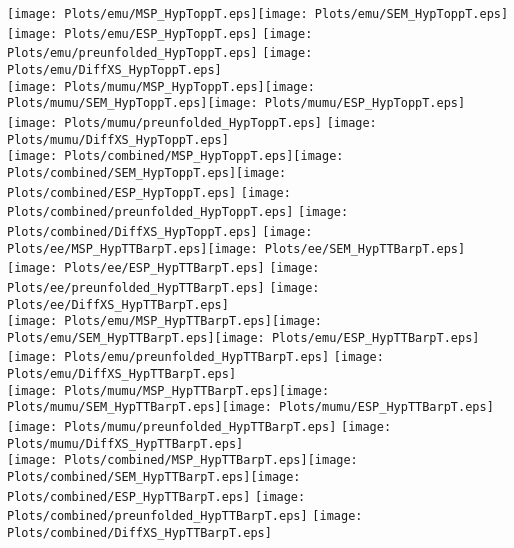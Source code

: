 \documentclass[a4paper,10pt,landscape,pagesize]{scrartcl}
\begin{document}
\texttt{[image: Plots/emu/MSP\_HypToppT.eps]}\texttt{[image: Plots/emu/SEM\_HypToppT.eps]}\texttt{[image: Plots/emu/ESP\_HypToppT.eps]} \texttt{[image: Plots/emu/preunfolded\_HypToppT.eps]} \texttt{[image: Plots/emu/DiffXS\_HypToppT.eps]}\\
\texttt{[image: Plots/mumu/MSP\_HypToppT.eps]}\texttt{[image: Plots/mumu/SEM\_HypToppT.eps]}\texttt{[image: Plots/mumu/ESP\_HypToppT.eps]} \texttt{[image: Plots/mumu/preunfolded\_HypToppT.eps]} \texttt{[image: Plots/mumu/DiffXS\_HypToppT.eps]}\\
\texttt{[image: Plots/combined/MSP\_HypToppT.eps]}\texttt{[image: Plots/combined/SEM\_HypToppT.eps]}\texttt{[image: Plots/combined/ESP\_HypToppT.eps]} \texttt{[image: Plots/combined/preunfolded\_HypToppT.eps]} \texttt{[image: Plots/combined/DiffXS\_HypToppT.eps]}
\newpage
\texttt{[image: Plots/ee/MSP\_HypTTBarpT.eps]}\texttt{[image: Plots/ee/SEM\_HypTTBarpT.eps]}\texttt{[image: Plots/ee/ESP\_HypTTBarpT.eps]} \texttt{[image: Plots/ee/preunfolded\_HypTTBarpT.eps]} \texttt{[image: Plots/ee/DiffXS\_HypTTBarpT.eps]}\\
\texttt{[image: Plots/emu/MSP\_HypTTBarpT.eps]}\texttt{[image: Plots/emu/SEM\_HypTTBarpT.eps]}\texttt{[image: Plots/emu/ESP\_HypTTBarpT.eps]} \texttt{[image: Plots/emu/preunfolded\_HypTTBarpT.eps]} \texttt{[image: Plots/emu/DiffXS\_HypTTBarpT.eps]}\\
\texttt{[image: Plots/mumu/MSP\_HypTTBarpT.eps]}\texttt{[image: Plots/mumu/SEM\_HypTTBarpT.eps]}\texttt{[image: Plots/mumu/ESP\_HypTTBarpT.eps]} \texttt{[image: Plots/mumu/preunfolded\_HypTTBarpT.eps]} \texttt{[image: Plots/mumu/DiffXS\_HypTTBarpT.eps]}\\
\texttt{[image: Plots/combined/MSP\_HypTTBarpT.eps]}\texttt{[image: Plots/combined/SEM\_HypTTBarpT.eps]}\texttt{[image: Plots/combined/ESP\_HypTTBarpT.eps]} \texttt{[image: Plots/combined/preunfolded\_HypTTBarpT.eps]} \texttt{[image: Plots/combined/DiffXS\_HypTTBarpT.eps]}
\end{document}
